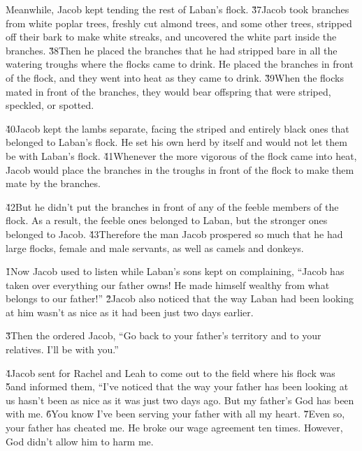 Meanwhile, Jacob kept tending the rest of Laban's flock. \v{37}Jacob took branches from white poplar trees, freshly cut almond trees, and some other trees, stripped off their bark to make white streaks, and uncovered the white part inside the branches. \v{38}Then he placed the branches that he had stripped bare in all the watering troughs where the flocks came to drink. He placed the branches in front of the flock, and they went into heat as they came to drink. \v{39}When the flocks mated in front of the branches, they would bear offspring that were striped, speckled, or spotted.

\v{40}Jacob kept the lambs separate, facing the striped and entirely black ones that belonged to Laban's flock. He set his own herd by itself and would not let them be with Laban's flock. \v{41}Whenever the more vigorous of the flock came into heat, Jacob would place the branches in the troughs in front of the flock to make them mate by the branches.

\v{42}But he didn't put the branches in front of any of the feeble members of the flock. As a result, the feeble ones belonged to Laban, but the stronger ones belonged to Jacob. \v{43}Therefore the man Jacob prospered so much that he had large flocks, female and male servants, as well as camels and donkeys.

\v{1}Now Jacob used to listen while Laban's sons kept on complaining, ``Jacob has taken over everything our father owns! He made himself wealthy from what belongs to our father!'' \v{2}Jacob also noticed that the way Laban had been looking at him wasn't as nice as it had been just two days earlier.

\v{3}Then the  ordered Jacob, ``Go back to your father's territory and to your relatives. I'll be with you.''

\v{4}Jacob sent for Rachel and Leah to come out to the field where his flock was \v{5}and informed them, ``I've noticed that the way your father has been looking at us hasn't been as nice as it was just two days ago. But my father's God has been with me. \v{6}You know I've been serving your father with all my heart. \v{7}Even so, your father has cheated me. He broke our wage agreement ten times. However, God didn't allow him to harm me.

